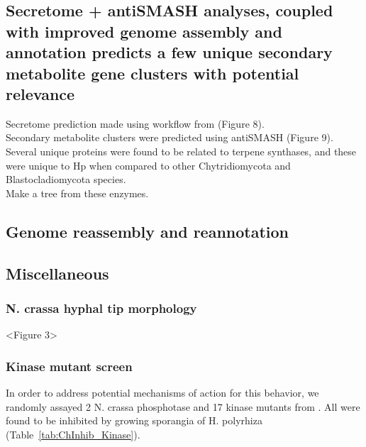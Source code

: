 \subsection{Secretome + antiSMASH analyses, coupled with improved genome assembly and annotation predicts a few unique secondary metabolite gene clusters with potential relevance}
Secretome prediction made using workflow from \cite{Min2010} (Figure 8). \\
\indent Secondary metabolite clusters were predicted using antiSMASH \cite{Blin2013} (Figure 9).\\
\indent Several unique proteins were found to be related to terpene synthases, and these were unique to Hp when compared to other Chytridiomycota and Blastocladiomycota species.\\
\indent Make a tree from these enzymes.\\
\subsection{Genome reassembly and reannotation}
\subsection{Miscellaneous}
\subsubsection{N. crassa hyphal tip morphology}
<Figure 3>\\
\subsubsection{Kinase mutant screen}
In order to address potential mechanisms of action for this behavior, we randomly assayed 2 N. crassa phosphotase and 17 kinase mutants from \cite{Park2011}. All were found to be inhibited by growing sporangia of H. polyrhiza (Table~\ref{tab:ChInhib_Kinase}).\\
